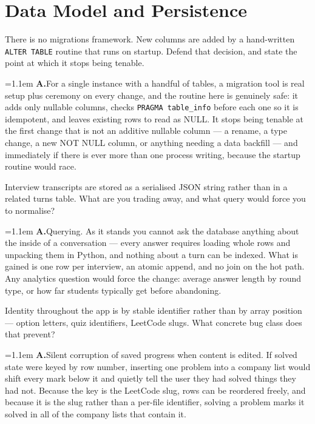 \documentclass[11pt,a4paper]{article}
\newcommand{\code}[1]{\texttt{\small #1}}
\newcommand{\ans}[1]{%
  \par\vspace{0.32em}%
  \begingroup
  \small\color{answerink}%
  \leftskip=1.1em
  \noindent\textbf{\color{accent}A.}\hspace{0.45em}#1\par
  \endgroup
  \vspace{0.1em}%
}
\begin{document}
\section{Data Model and Persistence}
\begin{questions}[resume]

\item There is no migrations framework. New columns are added by a hand-written
\code{ALTER TABLE} routine that runs on startup. Defend that decision, and state
the point at which it stops being tenable.
\ans{For a single instance with a handful of tables, a migration tool is real
setup plus ceremony on every change, and the routine here is genuinely safe: it
adds only nullable columns, checks \code{PRAGMA table\_info} before each one so it
is idempotent, and leaves existing rows to read as NULL. It stops being tenable
at the first change that is not an additive nullable column --- a rename, a type
change, a new NOT NULL column, or anything needing a data backfill --- and
immediately if there is ever more than one process writing, because the startup
routine would race.}

\item Interview transcripts are stored as a serialised JSON string rather than in
a related turns table. What are you trading away, and what query would force you
to normalise?
\ans{Querying. As it stands you cannot ask the database anything about the inside
of a conversation --- every answer requires loading whole rows and unpacking them
in Python, and nothing about a turn can be indexed. What is gained is one row per
interview, an atomic append, and no join on the hot path. Any analytics question
would force the change: average answer length by round type, or how far students
typically get before abandoning.}

\item Identity throughout the app is by stable identifier rather than by array
position --- option letters, quiz identifiers, LeetCode slugs. What concrete bug
class does that prevent?
\ans{Silent corruption of saved progress when content is edited. If solved state
were keyed by row number, inserting one problem into a company list would shift
every mark below it and quietly tell the user they had solved things they had
not. Because the key is the LeetCode slug, rows can be reordered freely, and
because it is the slug rather than a per-file identifier, solving a problem marks
it solved in all of the company lists that contain it.}


\end{questions}
\end{document}
